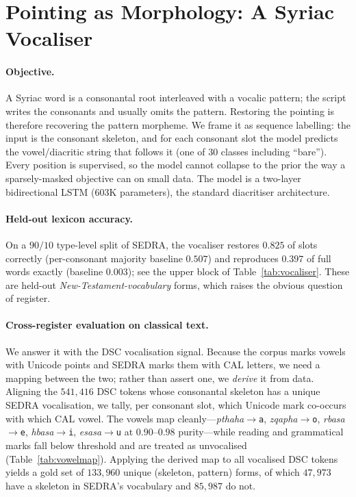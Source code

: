 \documentclass[11pt]{article}
\newcommand{\cal}[1]{\texttt{#1}}         %
\begin{document}
\section{Pointing as Morphology: A Syriac Vocaliser}
\label{sec:vocaliser}

\paragraph{Objective.}
A Syriac word is a consonantal root interleaved with a vocalic pattern; the script
writes the consonants and usually omits the pattern. Restoring the pointing is
therefore recovering the pattern morpheme. We frame it as sequence labelling: the
input is the consonant skeleton, and for each consonant slot the model predicts
the vowel/diacritic string that follows it (one of $30$ classes including
``bare''). Every position is supervised, so the model cannot collapse to the prior
the way a sparsely-masked objective can on small data. The model is a two-layer
bidirectional LSTM ($603$K parameters), the standard diacritiser architecture.

\paragraph{Held-out lexicon accuracy.}
On a $90/10$ type-level split of SEDRA, the vocaliser restores $0.825$ of slots
correctly (per-consonant majority baseline $0.507$) and reproduces $0.397$ of full
words exactly (baseline $0.003$); see the upper block of Table~\ref{tab:vocaliser}.
These are held-out \emph{New-Testament-vocabulary} forms, which raises the obvious
question of register.

\paragraph{Cross-register evaluation on classical text.}
We answer it with the DSC vocalisation signal. Because the corpus marks vowels with
Unicode points and SEDRA marks them with CAL letters, we need a mapping between the
two; rather than assert one, we \emph{derive} it from data. Aligning the $541{,}416$
DSC tokens whose consonantal skeleton has a unique SEDRA vocalisation, we tally,
per consonant slot, which Unicode mark co-occurs with which CAL vowel. The vowels
map cleanly---\emph{pthaha}$\to$\cal{a}, \emph{zqapha}$\to$\cal{o},
\emph{rbasa}$\to$\cal{e}, \emph{hbasa}$\to$\cal{i}, \emph{esasa}$\to$\cal{u} at
$0.90$--$0.98$ purity---while reading and grammatical marks fall below threshold and
are treated as unvocalised (Table~\ref{tab:vowelmap}). Applying the derived map to
all vocalised DSC tokens yields a gold set of $133{,}960$ unique
(skeleton, pattern) forms, of which $47{,}973$ have a skeleton in SEDRA's
vocabulary and $85{,}987$ do not.
\end{document}
